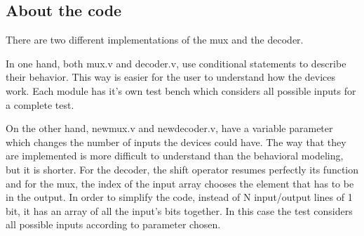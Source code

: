 \subsection*{About the code}

There are two different implementations of the mux and the decoder.

In one hand, both mux.v and decoder.v, use conditional statements to describe their behavior. This way is easier for the user to understand how the devices work.
Each module has it's own test bench which considers all possible inputs for a complete test.

On the other hand, newmux.v and newdecoder.v, have a variable parameter which changes the number of inputs the devices could have. The way that they are implemented is more difficult to understand than the behavioral modeling, but it is shorter. For the decoder, the shift operator resumes perfectly its function and for the mux, the index of the input array chooses the element that has to be in the output.
In order to simplify the code, instead of N input/output lines of 1 bit, it has an array of all the input's bits together. In this case the test considers all possible inputs according to parameter chosen.
  

